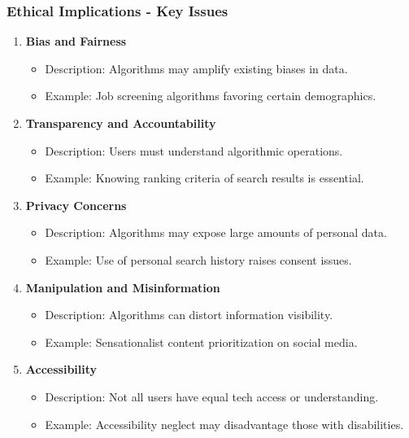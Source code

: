 \documentclass[aspectratio=169]{beamer}
\begin{document}
\begin{frame}[fragile]
  \frametitle{Ethical Implications - Key Issues}
  \begin{enumerate}
    \item \textbf{Bias and Fairness}
      \begin{itemize}
        \item Description: Algorithms may amplify existing biases in data.
        \item Example: Job screening algorithms favoring certain demographics.
      \end{itemize}
    
    \item \textbf{Transparency and Accountability}
      \begin{itemize}
        \item Description: Users must understand algorithmic operations.
        \item Example: Knowing ranking criteria of search results is essential.
      \end{itemize}
    
    \item \textbf{Privacy Concerns}
      \begin{itemize}
        \item Description: Algorithms may expose large amounts of personal data.
        \item Example: Use of personal search history raises consent issues.
      \end{itemize}
    
    \item \textbf{Manipulation and Misinformation}
      \begin{itemize}
        \item Description: Algorithms can distort information visibility.
        \item Example: Sensationalist content prioritization on social media.
      \end{itemize}
    
    \item \textbf{Accessibility}
      \begin{itemize}
        \item Description: Not all users have equal tech access or understanding.
        \item Example: Accessibility neglect may disadvantage those with disabilities.
      \end{itemize}
  \end{enumerate}
\end{frame}
\end{document}
